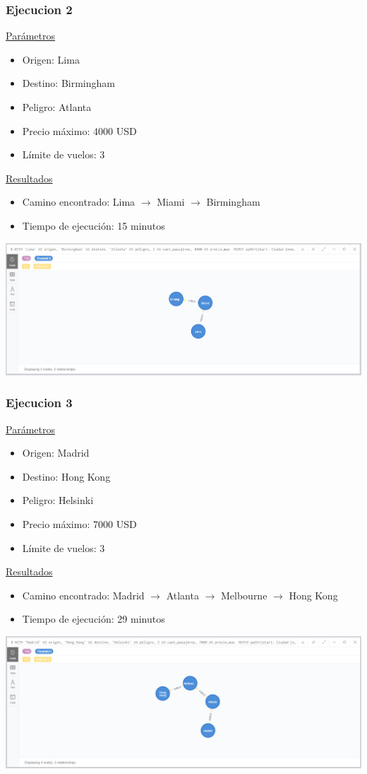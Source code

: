 \documentclass[a4paper,11pt]{article}
\begin{document}
\subsubsection*{Ejecucion 2}
\noindent
\underline{Parámetros}
\begin{itemize}
\item Origen: Lima
\item Destino: Birmingham
\item Peligro: Atlanta
\item Precio máximo: 4000 USD
\item Límite de vuelos: 3
\end{itemize}
\underline{Resultados}
\begin{itemize}
\item Camino encontrado: Lima $\rightarrow$ Miami $\rightarrow$ Birmingham
\item Tiempo de ejecución: 15 minutos
\end{itemize}
\begin{center}
\includegraphics[scale=0.40]{./imagenes/consultaB-ejec2.png}
\end{center}
\newpage
\subsubsection*{Ejecucion 3}
\noindent
\underline{Parámetros}
\begin{itemize}
\item Origen: Madrid
\item Destino: Hong Kong
\item Peligro: Helsinki
\item Precio máximo: 7000 USD
\item Límite de vuelos: 3
\end{itemize}
\underline{Resultados}
\begin{itemize}
\item Camino encontrado: Madrid $\rightarrow$ Atlanta $\rightarrow$ Melbourne $\rightarrow$ Hong Kong
\item Tiempo de ejecución: 29 minutos
\end{itemize}
\begin{center}
\includegraphics[scale=0.40]{./imagenes/consultaB-ejec3.png}
\end{center}
\newpage
\end{document}
